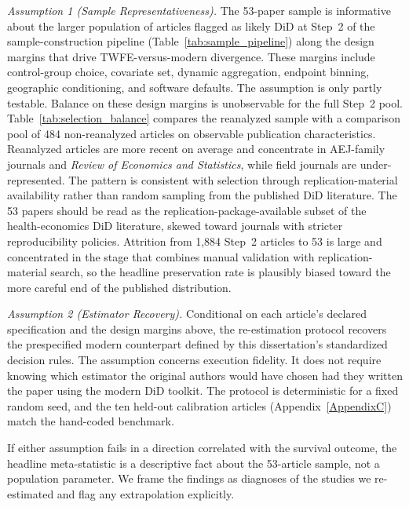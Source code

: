 \textit{Assumption 1 (Sample Representativeness).} The 53-paper sample is informative about the larger population of articles flagged as likely DiD at Step~2 of the sample-construction pipeline (Table~\ref{tab:sample_pipeline}) along the design margins that drive TWFE-versus-modern divergence. These margins include control-group choice, covariate set, dynamic aggregation, endpoint binning, geographic conditioning, and software defaults. The assumption is only partly testable. Balance on these design margins is unobservable for the full Step~2 pool. Table~\ref{tab:selection_balance} compares the reanalyzed sample with a comparison pool of 484 non-reanalyzed articles on observable publication characteristics. Reanalyzed articles are more recent on average and concentrate in AEJ-family journals and \emph{Review of Economics and Statistics}, while field journals are under-represented. The pattern is consistent with selection through replication-material availability rather than random sampling from the published DiD literature. The 53 papers should be read as the replication-package-available subset of the health-economics DiD literature, skewed toward journals with stricter reproducibility policies. Attrition from 1,884 Step~2 articles to 53 is large and concentrated in the stage that combines manual validation with replication-material search, so the headline preservation rate is plausibly biased toward the more careful end of the published distribution.



\textit{Assumption 2 (Estimator Recovery).} Conditional on each article's declared specification and the design margins above, the re-estimation protocol recovers the prespecified modern counterpart defined by this dissertation's standardized decision rules. The assumption concerns execution fidelity. It does not require knowing which estimator the original authors would have chosen had they written the paper using the modern DiD toolkit. The protocol is deterministic for a fixed random seed, and the ten held-out calibration articles (Appendix~\ref{AppendixC}) match the hand-coded benchmark.

If either assumption fails in a direction correlated with the survival outcome, the headline meta-statistic is a descriptive fact about the 53-article sample, not a population parameter. We frame the findings as diagnoses of the studies we re-estimated and flag any extrapolation explicitly.

